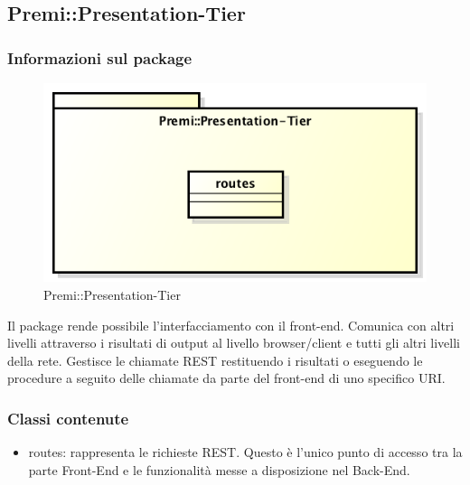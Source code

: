 \newpage

\subsection{Premi::Presentation-Tier}
	\subsubsection*{Informazioni sul package}
		\begin{figure}[h]
			\centering
			\includegraphics[width=0.5\linewidth]{img/premi_presentation-tier}
			\caption[Premi::Presentation-Tier]{Premi::Presentation-Tier}
		\end{figure}
		Il package rende possibile l'interfacciamento con il \gls{front-end}. Comunica con altri livelli attraverso i risultati di output al livello browser/client e tutti gli altri livelli della rete.
		Gestisce le chiamate \gls{REST} restituendo i risultati o eseguendo le procedure a seguito delle chiamate da parte del \gls{front-end} di uno specifico \gls{URI}. 
		\subsubsection*{Classi contenute}
		\begin{itemize}
			\item routes: rappresenta le richieste REST. Questo è l'unico punto di accesso tra la parte Front-End e le funzionalità messe a disposizione nel Back-End.
		\end{itemize}
		
\newpage
		
